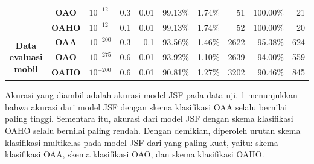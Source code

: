 \begin{table}[htbp!]
{\begin{tabular}{cclrrrrrrr}
          & \textbf{OAO} & $10^{-12}$ & 0.3   & 0.01  & 99.13\% & 1.74\% & 51    & 100.00\% & 21 \\
          & \textbf{OAHO} & $10^{-12}$ & 0.1   & 0.01  & 99.13\% & 1.74\% & 52    & 100.00\% & 20 \\
    \multicolumn{1}{c}{\multirow{3}[1]{*}{\textbf{Data evaluasi mobil}}} & \textbf{OAA} & $10^{-200}$ & 0.3   & 0.1   & 93.56\% & 1.46\% & 2622  & 95.38\% & 624 \\
          & \textbf{OAO} & $10^{-275}$ & 0.6   & 0.01  & 93.92\% & 1.10\% & 2639  & 94.00\% & 559 \\
          & \textbf{OAHO} & $10^{-200}$ & 0.6   & 0.01  & 90.81\% & 1.27\% & 3202  & 90.46\% & 845 \\
    \bottomrule
    \end{tabular}%
    }
  \label{tab: ringkasan performa}%
\end{table}%

\noindent Akurasi yang diambil adalah akurasi model JSF pada data uji. \ref{tab: ringkasan performa} menunjukkan bahwa akurasi dari model JSF dengan skema klasifikasi OAA selalu bernilai paling tinggi. Sementara itu, akurasi dari model JSF dengan skema klasifikasi OAHO selalu bernilai paling rendah. Dengan demikian, diperoleh urutan skema klasifikasi multikelas pada model JSF dari yang paling kuat, yaitu: skema klasifikasi OAA, skema klasifikasi OAO, dan skema klasifikasi OAHO.